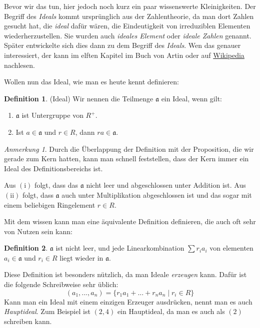 \documentclass{article}
\theoremstyle{definition}
\newtheorem*{definition}{Definition}
\theoremstyle{remark}
\newtheorem*{anm}{Anmerkung}
\begin{document}
\vspace{0.7em}
Bevor wir das tun, hier jedoch noch kurz ein paar wissenswerte Kleinigkeiten. Der Begriff des \emph{Ideals}
kommt ursprünglich aus der Zahlentheorie, da man dort Zahlen gesucht hat, die \emph{ideal} dafür wären, die
Eindeutigkeit von irreduziblen Elementen wiederherzustellen. Sie wurden auch \emph{ideales Element} oder
\emph{ideale Zahlen} genannt. Später entwickelte sich dies dann zu dem Begriff des \emph{Ideals}. Wen das
genauer interessiert, der kann im elften Kapitel im Buch von Artin oder auf
\href{https://de.wikipedia.org/wiki/Ideal_(Ringtheorie)#%E2%80%9EIdeale_Zahlen%E2%80%9C}{Wikipedia} nachlesen.

\vspace{0.7em}
Wollen nun das Ideal, wie man es heute kennt definieren:

\begin{definition}(Ideal) Wir nennen die Teilmenge $\mathfrak a$ ein Ideal, wenn gilt:
\begin{enumerate}[label=(\roman*)]
    \item $\mathfrak a$ ist Untergruppe von $R^+$.
    \item Ist $a \in \mathfrak a$ und $r\in R$, dann $ra \in \mathfrak a$.
\end{enumerate}
\end{definition}

\begin{anm}
Durch die Überlappung der Definition mit der Proposition, die wir gerade zum Kern hatten, kann man schnell
feststellen, dass der Kern immer ein Ideal des Definitionsbereichs ist.
\end{anm}

Aus $(\mathrm i)$ folgt, dass das $\mathfrak a$ nicht leer und abgeschlossen unter Addition ist. Aus
$(\mathrm{ii})$ folgt, dass $\mathfrak a$ auch unter Multiplikation abgeschlossen ist und das sogar mit einem
beliebigen Ringelement $r\in R$.

\vspace{0.7em}
Mit dem wissen kann man eine äquivalente Definition definieren, die auch oft sehr von Nutzen sein kann:

\begin{definition}
$\mathfrak a$ ist nicht leer, und jede Linearkombination $\sum r_i a_i$ von elementen $a_i\in \mathfrak a$ und
    $r_i\in R$ liegt wieder in $\mathfrak a$.
\end{definition}

Diese Definition ist besonders nützlich, da man Ideale \emph{erzeugen} kann. Dafür ist die folgende
Schreibweise sehr üblich:
\[(a_1,...,a_n)=\{r_1 a_1 + ... + r_n a_n \mid r_i\in R\}\]
Kann man ein Ideal mit einem einzigen Erzeuger ausdrücken, nennt man es auch \emph{Hauptideal}. Zum Beispiel
ist $(2,4)$ ein Hauptideal, da man es auch als $(2)$ schreiben kann.
\end{document}
